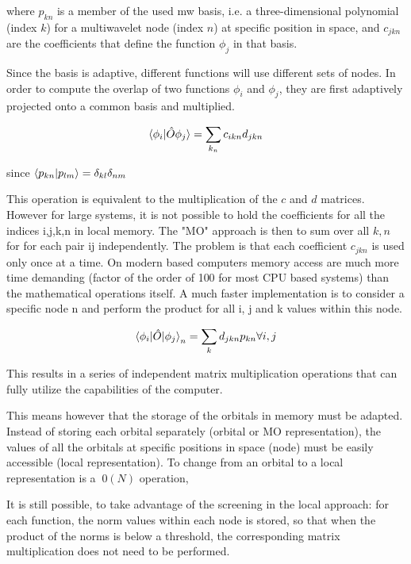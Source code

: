 \documentclass{article}
\begin{document}
where $p_{kn}$ is a member of the used mw basis, i.e. a three-dimensional polynomial (index $k$) for a multiwavelet node (index $n$) at specific position in space, and $c_{jkn}$ are the coefficients that define the function $\phi_j$ in that basis. 

Since the basis is adaptive, different functions will use different sets of nodes. 
In order to compute the overlap of two functions $\phi_i$ and $\phi_j$, they are first adaptively projected onto a common basis and multiplied.

\begin{equation}
  \braket{\phi_i|{\hat O} \phi_j} = \sum_{k_n} c_{ikn}d_{jkn}
\end{equation}

since $\braket{p_{kn}|p_{lm}} = \delta_{kl}\delta_{nm}$

This operation is equivalent to the multiplication of the $c$ and $d$ matrices. However for large systems, it is not possible to hold the coefficients for all the indices i,j,k,n in local memory.
The "MO" approach is then to sum over all $k,n$ for for each pair ij independently. The problem is that each coefficient $c_{jkn}$ is used only once at a time. On modern based computers memory access are much more time demanding (factor of the order of 100 for most CPU based systems) than the mathematical operations itself.  A much faster implementation is to consider a specific node n and perform the product for all i, j and k values within this node. 

\begin{equation}
  \braket{\phi_i | {\hat O} |\phi_j}_n = \sum_{k} d_{jkn} p_{kn} \forall i,j
\end{equation}

This results in a series of independent matrix multiplication operations that can fully utilize the capabilities of the computer. 

This means however that the storage of the orbitals in memory must be adapted. Instead of storing each orbital separately (orbital or MO representation), the values of all the orbitals at specific positions in space (node) must be easily accessible (local representation). To change from an orbital to a local representation is a $~0(N)$ operation,

It is still possible, to take advantage of the screening in the local approach: for each function, the norm values within each node is stored, so that when the product of the norms is below a threshold, the corresponding matrix multiplication does not need to be performed.
\end{document}
